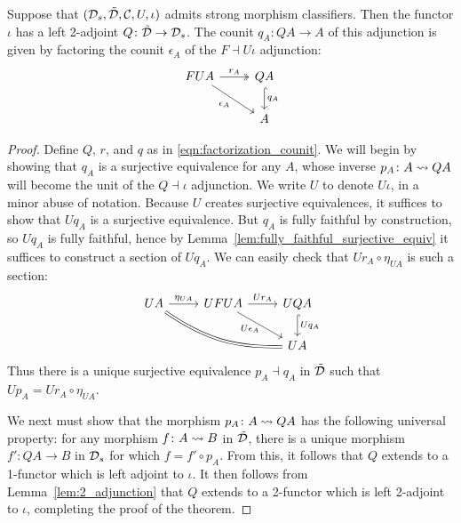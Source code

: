 \documentclass[11pt,oneside,article]{memoir}
\begin{document}
\begin{theorem}
    \label{thm:strong_classifier}
  Suppose that $(\mathcal{D}_s,\tilde{\mathcal{D}},\mathcal{C},U,\iota)$ admits strong morphism classifiers. Then the
  functor $\iota$ has a left 2-adjoint $Q\colon\tilde{\mathcal{D}}\to\mathcal{D}_s$. The counit $q_A\colon QA\to A$
  of this adjunction is given by factoring the counit $\epsilon_A$ of the $F\dashv U\iota$
  adjunction:
  \begin{equation} \begin{tikzcd}
      \label{eqn:factorization_counit}
    FUA \ar[r,two heads,"r_A"] \ar[dr,"\epsilon_A"']
      & QA \ar[d,hook,"q_A"] \\
    & A
  \end{tikzcd} \end{equation}
\end{theorem}
\begin{proof}
  Define $Q$, $r$, and $q$ as in \eqref{eqn:factorization_counit}. We will begin by showing that
  $q_A$ is a surjective equivalence for any $A$, whose inverse $p_A\colon A\rightsquigarrow QA$ will become the
  unit of the $Q\dashv\iota$ adjunction. We write $U$ to denote $U\iota$, in a minor abuse of
  notation. Because $U$ creates surjective equivalences, it suffices to show that $Uq_A$ is a
  surjective equivalence. But $q_A$ is fully faithful by construction, so $Uq_A$ is fully faithful,
  hence by Lemma~\ref{lem:fully_faithful_surjective_equiv} it suffices to construct a section of
  $Uq_A$. We can easily check that $Ur_A\circ\eta_{UA}$ is such a section:
  \[ \begin{tikzcd}
    UA \ar[r,"\eta_{UA}"] \ar[rrd,bend right=18,equal]
      & UFUA \ar[r,"Ur_A"] \ar[dr,"U\epsilon_A"' inner sep=0pt]
      & UQA \ar[d,hook,"Uq_A"] \\
    && UA
  \end{tikzcd} \]
  Thus there is a unique surjective equivalence $p_A\dashv q_A$ in $\tilde{\mathcal{D}}$ such that $Up_A=
  Ur_A\circ\eta_{UA}$.

  We next must show that the morphism $p_A\colon A\rightsquigarrow QA$ has the following universal property: for
  any morphism $f\colon A\rightsquigarrow B$ in $\tilde{\mathcal{D}}$, there is a unique morphism $f'\colon QA\to B$ in
  $\mathcal{D}_s$ for which $f=f'\circ p_A$. From this, it follows that $Q$ extends to a 1-functor which
  is left adjoint to $\iota$. It then follows from Lemma~\ref{lem:2_adjunction} that $Q$ extends to
  a 2-functor which is left 2-adjoint to $\iota$, completing the proof of the theorem.


\end{proof}
\end{document}
